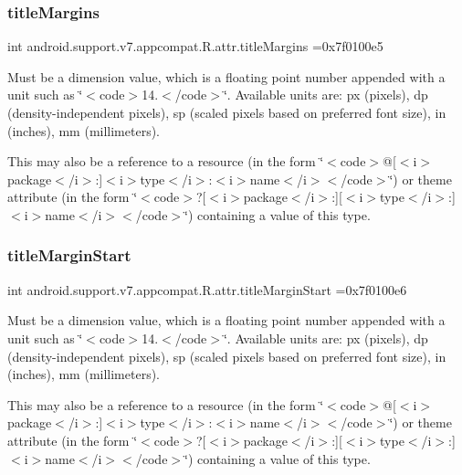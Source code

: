 \subsubsection{\texorpdfstring{title\+Margins}{titleMargins}}
{\footnotesize\ttfamily int android.\+support.\+v7.\+appcompat.\+R.\+attr.\+title\+Margins =0x7f0100e5\hspace{0.3cm}{\ttfamily [static]}}

Must be a dimension value, which is a floating point number appended with a unit such as \char`\"{}$<$code$>$14.\+5sp$<$/code$>$\char`\"{}. Available units are\+: px (pixels), dp (density-\/independent pixels), sp (scaled pixels based on preferred font size), in (inches), mm (millimeters). 

This may also be a reference to a resource (in the form \char`\"{}$<$code$>$@\mbox{[}$<$i$>$package$<$/i$>$\+:\mbox{]}$<$i$>$type$<$/i$>$\+:$<$i$>$name$<$/i$>$$<$/code$>$\char`\"{}) or theme attribute (in the form \char`\"{}$<$code$>$?\mbox{[}$<$i$>$package$<$/i$>$\+:\mbox{]}\mbox{[}$<$i$>$type$<$/i$>$\+:\mbox{]}$<$i$>$name$<$/i$>$$<$/code$>$\char`\"{}) containing a value of this type. \mbox{\label{classandroid_1_1support_1_1v7_1_1appcompat_1_1R_1_1attr_adffd0131a9232a46d35e844631b0f817}} 
\subsubsection{\texorpdfstring{title\+Margin\+Start}{titleMarginStart}}
{\footnotesize\ttfamily int android.\+support.\+v7.\+appcompat.\+R.\+attr.\+title\+Margin\+Start =0x7f0100e6\hspace{0.3cm}{\ttfamily [static]}}

Must be a dimension value, which is a floating point number appended with a unit such as \char`\"{}$<$code$>$14.\+5sp$<$/code$>$\char`\"{}. Available units are\+: px (pixels), dp (density-\/independent pixels), sp (scaled pixels based on preferred font size), in (inches), mm (millimeters). 

This may also be a reference to a resource (in the form \char`\"{}$<$code$>$@\mbox{[}$<$i$>$package$<$/i$>$\+:\mbox{]}$<$i$>$type$<$/i$>$\+:$<$i$>$name$<$/i$>$$<$/code$>$\char`\"{}) or theme attribute (in the form \char`\"{}$<$code$>$?\mbox{[}$<$i$>$package$<$/i$>$\+:\mbox{]}\mbox{[}$<$i$>$type$<$/i$>$\+:\mbox{]}$<$i$>$name$<$/i$>$$<$/code$>$\char`\"{}) containing a value of this type. \mbox{\label{classandroid_1_1support_1_1v7_1_1appcompat_1_1R_1_1attr_a73f7b3964dcf1c57c0aae23104349f19}} 

